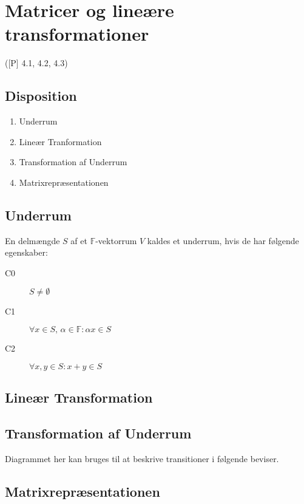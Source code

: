 \newpage
\chapter{Matricer og lineære transformationer}
([P] 4.1, 4.2, 4.3)

\section*{Disposition}
\begin{enumerate}
	\item Underrum
	\item Lineær Tranformation
	\item Transformation af Underrum
	\item Matrixrepræsentationen
\end{enumerate}

\section{Underrum}
En delmængde $S$ af et $\mathbb{F}$-vektorrum $V$ kaldes et underrum, hvis de
har følgende egenskaber:
\begin{description}
	\item[C0] $S \not= \emptyset$
	\item[C1] $\forall x \in S, \, \alpha \in \mathbb{F} \colon \alpha x \in S$
	\item[C2] $\forall x,y \in S \colon x + y \in S$
\end{description}

\section{Lineær Transformation}


\section{Transformation af Underrum}


Diagrammet her kan bruges til at beskrive transitioner i følgende
beviser.
\begin{center}

\end{center}

\section{Matrixrepræsentationen}



